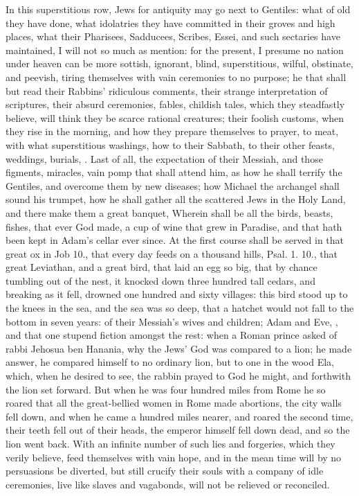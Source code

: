 {In this superstitious row, Jews for antiquity may go next to Gentiles:
what of old they have done, what idolatries they have committed in
their groves and high places, what their Pharisees, Sadducees, Scribes,
Essei, and such sectaries have maintained, I will not so much as
mention: for the present, I presume no nation under heaven can be more
sottish, ignorant, blind, superstitious, wilful, obstinate, and
peevish, tiring themselves with vain ceremonies to no purpose; he that
shall but read their Rabbins' ridiculous comments, their strange
interpretation of scriptures, their absurd ceremonies, fables, childish
tales, which they steadfastly believe, will think they be scarce
rational creatures; their foolish customs, when they rise in the
morning, and how they prepare themselves to prayer, to meat, with what
superstitious washings, how to their Sabbath, to their other feasts,
weddings, burials, \etc{}. Last of all, the expectation of their Messiah,
and those figments, miracles, vain pomp that shall attend him, as how
he shall terrify the Gentiles, and overcome them by new diseases; how
Michael the archangel shall sound his trumpet, how he shall gather all
the scattered Jews in the Holy Land, and there make them a great
banquet,  Wherein shall be all the birds, beasts, fishes, that
ever God made, a cup of wine that grew in Paradise, and that hath been
kept in Adam's cellar ever since. At the first course shall be served
in that great ox in Job  10., that every day feeds on a thousand
hills, Psal. 1. 10., that great Leviathan, and a great bird, that laid
an egg so big, that by chance tumbling out of the nest, it
knocked down three hundred tall cedars, and breaking as it fell,
drowned one hundred and sixty villages: this bird stood up to the knees
in the sea, and the sea was so deep, that a hatchet would not fall to
the bottom in seven years: of their Messiah's wives and children;
Adam and Eve, \etc{}, and that one stupend fiction amongst the rest: when
a Roman prince asked of rabbi Jehosua ben Hanania, why the Jews' God
was compared to a lion; he made answer, he compared himself to no
ordinary lion, but to one in the wood Ela, which, when he desired to
see, the rabbin prayed to God he might, and forthwith the lion set
forward.  But when he was four hundred miles from Rome he so
roared that all the great-bellied women in Rome made abortions, the
city walls fell down, and when he came a hundred miles nearer, and
roared the second time, their teeth fell out of their heads, the
emperor himself fell down dead, and so the lion went back. With an
infinite number of such lies and forgeries, which they verily believe,
feed themselves with vain hope, and in the mean time will by no
persuasions be diverted, but still crucify their souls with a company
of idle ceremonies, live like slaves and vagabonds, will not be
relieved or reconciled.

}

